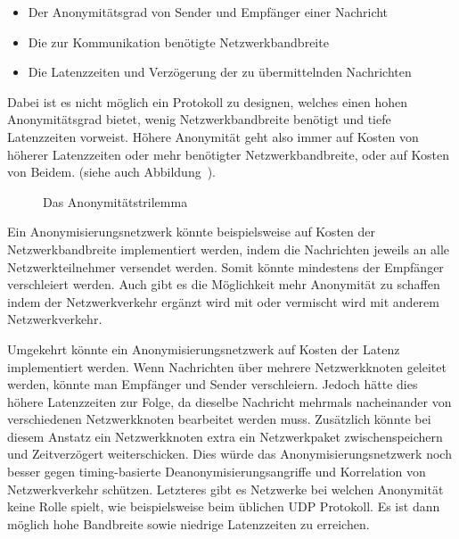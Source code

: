 \begin{itemize}
    \item Der Anonymitätsgrad von Sender und Empfänger einer Nachricht
    \item Die zur Kommunikation benötigte Netzwerkbandbreite
    \item Die Latenzzeiten und Verzögerung der zu übermittelnden Nachrichten
\end{itemize}

Dabei ist es nicht möglich ein Protokoll zu designen, welches einen hohen Anonymitätsgrad bietet, wenig Netzwerkbandbreite benötigt und tiefe Latenzzeiten vorweist. \parencite[S.~1]{das_anonymity_2018}
Höhere Anonymität geht also immer auf Kosten von höherer Latenzzeiten oder mehr benötigter Netzwerkbandbreite, oder auf Kosten von Beidem. 
(siehe auch Abbildung~).

\begin{figure}[H]
    \centering
    \caption{Das Anonymitätstrilemma}\label{fig:anonimitytrilemma}
\end{figure}

Ein Anonymisierungsnetzwerk könnte beispielsweise auf Kosten der Netzwerkbandbreite implementiert werden, indem die Nachrichten jeweils an alle Netzwerkteilnehmer versendet werden.  Somit könnte mindestens der Empfänger verschleiert werden.
Auch gibt es die Möglichkeit mehr Anonymität zu schaffen indem der Netzwerkverkehr ergänzt wird mit oder vermischt wird mit anderem Netzwerkverkehr.

Umgekehrt könnte ein Anonymisierungsnetzwerk auf Kosten der Latenz implementiert werden. Wenn Nachrichten über mehrere Netzwerkknoten geleitet werden, könnte man Empfänger und Sender verschleiern.
Jedoch hätte dies höhere Latenzzeiten zur Folge, da dieselbe Nachricht mehrmals nacheinander von verschiedenen Netzwerkknoten bearbeitet werden muss.
Zusätzlich könnte bei diesem Anstatz ein Netzwerkknoten extra ein Netzwerkpaket zwischenspeichern und Zeitverzögert weiterschicken.
Dies würde das Anonymisierungsnetzwerk noch besser gegen timing-basierte Deanonymisierungsangriffe und Korrelation von Netzwerkverkehr schützen.
Letzteres gibt es Netzwerke bei welchen Anonymität keine Rolle spielt, wie beispielsweise beim üblichen UDP Protokoll. Es ist dann möglich hohe Bandbreite sowie niedrige Latenzzeiten zu erreichen.

